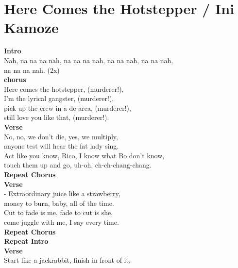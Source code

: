 \section{Here Comes the Hotstepper / Ini Kamoze}\label{sec:herecomesthehotstepper}
  
\Bminor
\Amajor
\Gmajor
\Aminor
\Fmajor
  
\textbf{Intro}\\
Nah, na na na nah, na na na nah, na na nah, na na nah,  \\
na na na nah.  (2x)\\
\textbf{chorus}\\
Here comes the hotstepper, (murderer!),\\
I’m the lyrical gangster, (murderer!),\\
pick up the crew in-a de area, (murderer!),\\
still love you like that, (murderer!).\\
\textbf{Verse}\\
No, no, we don’t die, yes, we multiply,\\
anyone test will hear the fat lady sing.\\
Act like you know, Rico,   I know what Bo don’t know,\\
touch them up and go, uh-oh,  ch-ch-chang-chang.\\
\textbf{Repeat Chorus}\\
\textbf{Verse}          \\           -                     
Extraordinary juice like a strawberry,\\
money to burn, baby, all of the time.\\
Cut to fade is me, fade to cut is she,\\
come juggle with me, I say every time.\\
\textbf{Repeat Chorus}\\
\textbf{Repeat Intro}\\
\textbf{Verse}\\
Start like a jackrabbit, finish in front of it,\\
